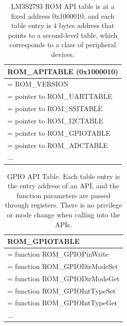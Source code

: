 \begin{center}
	\begin{table}
		\small
		\begin{tabular}{|p{7.2cm}|} 
			\hline
			ROM\_APITABLE (0x1000010) \\ [0.5ex] 
			\hline
			[0] = ROM\_VERSION \\
			\hline
			[1] = pointer to ROM\_UARTTABLE \\
			\hline
			[2] = pointer to ROM\_SSITABLE \\
			\hline
			[3] = pointer to ROM\_I2CTABLE \\
			\hline
			[4] = pointer to ROM\_GPIOTABLE \\
			\hline
			[5] = pointer to ROM\_ADCTABLE \\
			\hline
			... \\ 
			\hline
		\end{tabular}
		\caption{LM3S2793 ROM API table is at a fixed address 0x1000010, and each table entry is 4 bytes address that points to a second-level table, which corresponds to a class of peripheral devices.}
		\label{tab:romtable}
	\end{table}
\end{center}

\begin{center}
	\begin{table}
		\small
		\begin{tabular}{|p{7.2cm}|} 
			\hline
			ROM\_GPIOTABLE \\ [0.5ex] 
			\hline
			[0] = function ROM\_GPIOPinWrite \\
			\hline
			[1] = function ROM\_GPIODirModeSet \\
			\hline
			[2] = function ROM\_GPIODirModeGet \\
			\hline
			[3] = function ROM\_GPIOIntTypeSet \\
			\hline
			[4] = function ROM\_GPIOIntTypeGet \\
			\hline
			... \\ 
			\hline
		\end{tabular}
		\caption{GPIO API Table. Each table entry is the entry address of an API, and the function parameters are passed through registers. There is no privilege or mode change when calling into the APIs.}
		\label{tab:gpiotable}
	\end{table}
\end{center}



